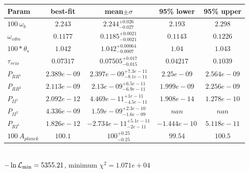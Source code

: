 \begin{tabular}{|l|c|c|c|c|} 
 \hline 
Param & best-fit & mean$\pm\sigma$ & 95\% lower & 95\% upper \\ \hline 
$100~\omega_{b }$ &$2.243$ & $2.244_{-0.027}^{+0.026}$ & $2.193$ & $2.298$ \\ 
$\omega_{cdm }$ &$0.1177$ & $0.1185_{-0.0021}^{+0.0021}$ & $0.1143$ & $0.1226$ \\ 
$100*\theta_{s }$ &$1.042$ & $1.042_{-0.0007}^{+0.00064}$ & $1.04$ & $1.043$ \\ 
$\tau_{reio }$ &$0.07317$ & $0.07505_{-0.015}^{+0.017}$ & $0.04217$ & $0.1039$ \\ 
$P_{{RR}^1 }$ &$2.389e-09$ & $2.397e-09_{-8.1e-11}^{+7.3e-11}$ & $2.25e-09$ & $2.564e-09$ \\ 
$P_{{RR}^2 }$ &$2.113e-09$ & $2.13e-09_{-6.9e-11}^{+6.5e-11}$ & $1.999e-09$ & $2.256e-09$ \\ 
$P_{{II}^1 }$ &$2.092e-12$ & $4.469e-11_{-4.5e-11}^{+1e-11}$ & $1.908e-14$ & $1.278e-10$ \\ 
$P_{{II}^2 }$ &$4.336e-09$ & $1.59e-09_{-1.6e-09}^{+2.3e-10}$ & $nan$ & $nan$ \\ 
$P_{{RI}^1 }$ &$1.826e-12$ & $-2.734e-11_{-2e-11}^{+5.1e-11}$ & $-1.444e-10$ & $5.118e-11$ \\ 
$100~A_{planck }$ &$100.1$ & $100_{-0.25}^{+0.25}$ & $99.54$ & $100.5$ \\ 
\hline 
 \end{tabular} \\ 
$-\ln{\cal L}_\mathrm{min} =5355.21$, minimum $\chi^2=1.071e+04$ \\ 
